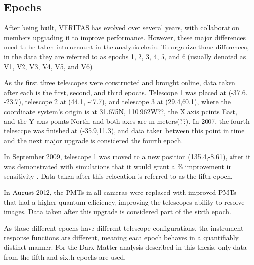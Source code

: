 \subsection{Epochs}\label{sec:epochs}
After being built, VERITAS has evolved over several years, with collaboration members upgrading it to improve performance.
However, these major differences need to be taken into account in the analysis chain.
To organize these differences, in the data they are referred to as epochs 1, 2, 3, 4, 5, and 6 (usually denoted as V1, V2, V3, V4, V5, and V6).

As the first three telescopes were constructed and brought online, data taken after each is the first, second, and third epochs.
Telescope 1 was placed at (-37.6, -23.7), telescope 2 at (44.1, -47.7), and telescope 3 at (29.4,60.1), where the coordinate system's origin is at 31.675N, 110.962W??, the X axis points East, and the Y axis points North, and both axes are in meters(??).
In 2007, the fourth telescope was finished at (-35.9,11.3), and data taken between this point in time and the next major upgrade is considered the fourth epoch.

In September 2009, telescope 1 was moved to a new position (135.4,-8.61), after it was demonstrated with simulations that it would grant a \% improvement in sensitivity \cite{veritas_t1_move}.
Data taken after this relocation is referred to as the fifth epoch.

In August 2012, the PMTs in all cameras were replaced with improved PMTs that had a higher quantum efficiency, improving the telescopes ability to resolve images\cite{pmtmodels}.
Data taken after this upgrade is considered part of the sixth epoch.

As these different epochs have different telescope configurations, the instrument response functions are different, meaning each epoch behaves in a quantifiably distinct manner.
For the Dark Matter analysis described in this thesis, only data from the fifth and sixth epochs are used.


